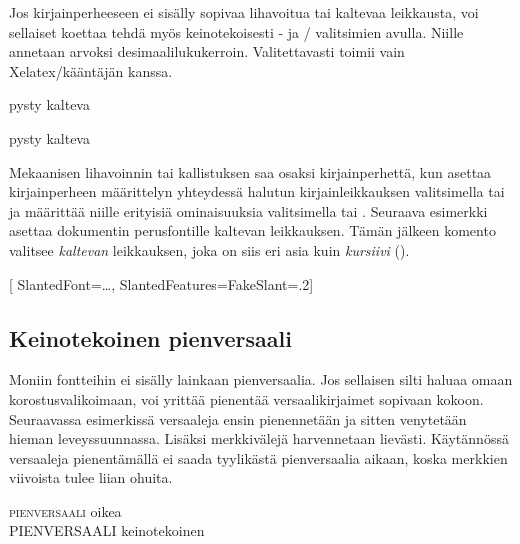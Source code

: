 Jos kirjainperheeseen ei sisälly sopivaa lihavoitua tai kaltevaa
leikkausta, voi sellaiset koettaa tehdä myös keinotekoisesti
- ja \-/ valitsimien avulla.
Niille annetaan arvoksi desimaalilukukerroin. Valitettavasti
 toimii vain Xelatex\-/kääntäjän kanssa.

\begin{koodilohkosis}
pysty { kalteva}
\end{koodilohkosis}

\begin{tulossis}
  pysty { kalteva}
\end{tulossis}

\noindent
Mekaanisen lihavoinnin tai kallistuksen saa osaksi kirjainperhettä, kun
asettaa kirjainperheen määrittelyn yhteydessä halutun kirjainleikkauksen
valitsimella  tai  ja määrittää
niille erityisiä ominaisuuksia valitsimella  tai
. Seuraava esimerkki asettaa dokumentin
perusfontille kaltevan leikkauksen. Tämän jälkeen komento
 valitsee \textsl{kaltevan} leikkauksen, joka on siis
eri asia kuin \textit{kursiivi} ().

\begin{koodilohkosis}
\setmainfont{…}[
  SlantedFont={…}, %
  SlantedFeatures={FakeSlant=.2}]
\end{koodilohkosis}

\subsection{Keinotekoinen pienversaali}
\label{luku/fontit-keinopienversaali}

Moniin fontteihin ei sisälly lainkaan pienversaalia. Jos sellaisen silti
haluaa omaan korostusvalikoimaan, voi yrittää pienentää
versaalikirjaimet sopivaan kokoon. Seuraavassa esimerkissä versaaleja
ensin pienennetään ja sitten venytetään hieman leveyssuunnassa. Lisäksi
merkkivälejä harvennetaan lievästi. Käytännössä versaaleja pienentämällä
ei saada tyylikästä pienversaalia aikaan, koska merkkien viivoista tulee
liian ohuita.

\begin{koodilohkosis}
\textsc{pienversaali} oikea \\
{
  PIENVERSAALI} keinotekoinen
\end{koodilohkosis}

